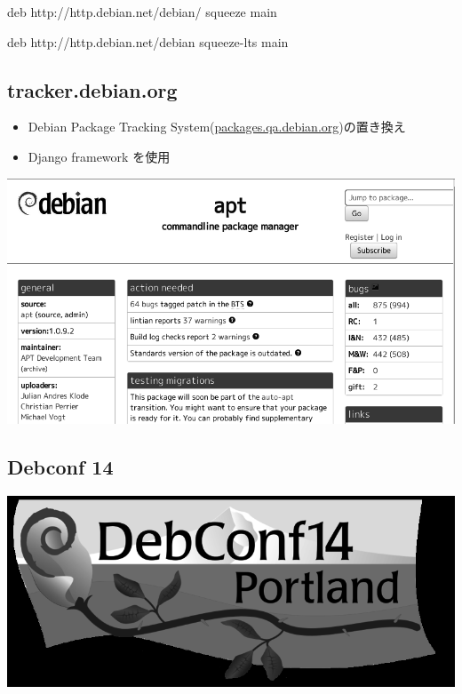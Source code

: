\documentclass[mingoth,a4paper]{jsarticle}
\begin{document}
\begin{commandline}
deb http://http.debian.net/debian/ squeeze main

deb http://http.debian.net/debian squeeze-lts main
\end{commandline}



\subsection{tracker.debian.org}
\begin{itemize}
\item Debian Package Tracking System(\url{packages.qa.debian.org})の置き換え
\item Django framework を使用
\end{itemize}

\begin{center}
\includegraphics[scale=0.3]{image201410/tracker_mono.png}
\end{center}




\subsection{Debconf 14}

\begin{center}
\includegraphics[scale=0.25]{image201410/debconf14-logo_mono.png}
\end{center}
\end{document}
